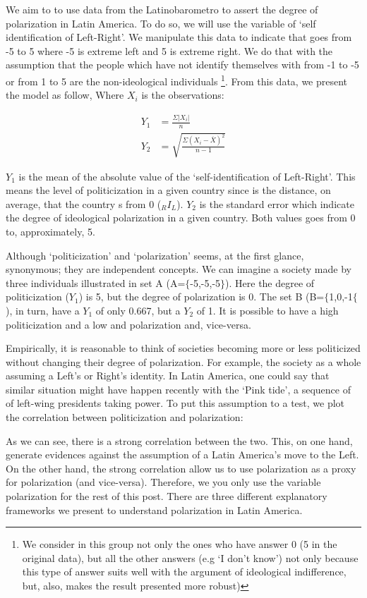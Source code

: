\documentclass[10pt]{article}
\begin{document}
We aim to to use data from the Latinobarometro to assert the degree of polarization in Latin America. To do so, we will use the variable of 
`self identification of Left-Right'. We manipulate this data to indicate that goes from -5 to 5 where -5 is extreme left and 5 is extreme right. We do that with the assumption that the people which have not identify themselves with from -1 to -5 or from 1 to 5 are the non-ideological individuals \footnote{We consider in this group not only the ones who have answer 0 (5 in the original data), but all the other answers (e.g `I don't know') not only because this type of answer suits well with the argument of ideological indifference, but, also, makes the result presented more robust)}. From this data, we present the model as follow, Where $X_{i}$ is the observations:

\begin{align}
Y_{1}&=\frac{\Sigma |X_{i}|}{n} \\
Y_{2}&=\sqrt{\frac{\Sigma (X_{i}-\overline{X})^2}{n-1}}
\end{align}

$Y_{1}$ is the mean of the absolute value of the `self-identification of Left-Right'. This means the level of politicization in a given country since is the distance, on average, that the country s from 0 ($_{R}I_{L}$). $Y_{2}$ is the standard error which indicate the degree of ideological polarization in a given country. Both values goes from 0 to, approximately, 5. 

Although `politicization' and `polarization' seems, at the first glance, synonymous; they are independent concepts. We can imagine a society made by three individuals illustrated in set A (A=$\{$-5,-5,-5$\}$). Here the degree of politicization ($Y_{1}$) is 5, but the degree of polarization is 0. The set B (B=$\{$1,0,-1$\{$), in turn, have a $Y_{1}$ of only 0.667, but a $Y_{2}$ of 1. It is possible to have a high politicization and a low and polarization and, vice-versa.

Empirically, it is reasonable to think of societies becoming more or less politicized without changing their degree of polarization. For example, the society as a whole assuming a Left's or Right's identity. In Latin America, one could say that similar situation might have happen recently with the `Pink tide', a sequence of of left-wing presidents taking power. To put this assumption to a test, we plot the correlation between politicization and polarization:

As we can see, there is a strong correlation between the two. This, on one hand, generate evidences against the assumption of a Latin America's move to the Left. On the other hand, the strong correlation allow us to use polarization as a proxy for polarization (and vice-versa). Therefore, we you only use the variable polarization for the rest of this post. There are three different explanatory frameworks we present to understand polarization in Latin America.
\end{document}
